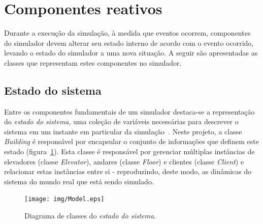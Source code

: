 \section{\label{model:reactive}Componentes reativos}

Durante a execução da simulação, à medida que eventos ocorrem, componentes do
simulador devem alterar seu estado interno de acordo com o evento ocorrido,
levando o estado do simulador a uma nova situação. A seguir são apresentadas as
classes que representam estes componentes no simulador.

\subsection{Estado do sistema}

Entre os componentes fundamentais de um simulador destaca-se a representação do
\textit{estado do sistema}, uma coleção de variáveis necessárias para descrever
o sistema em um instante em particular da simulação~\cite{Law}. Neste projeto, a
classe \textit{Building} é responsável por encapsular o conjunto de informações
que definem este estado (figura~\ref{fig:diagram:model}). Esta classe é
responsável por gerenciar múltiplas instâncias de elevadores (classe
\textit{Elevator}), andares (classe \textit{Floor}) e clientes (classe
\textit{Client}) e relacionar estas instâncias entre si - reproduzindo, deste
modo, as dinâmicas do sistema do mundo real que está sendo simulado.

\begin{figure}[htb!]
  \centering
  \texttt{[image: img/Model.eps]}
  \caption{Diagrama de classes do \textit{estado do sistema}.}
\label{fig:diagram:model}
\end{figure}

